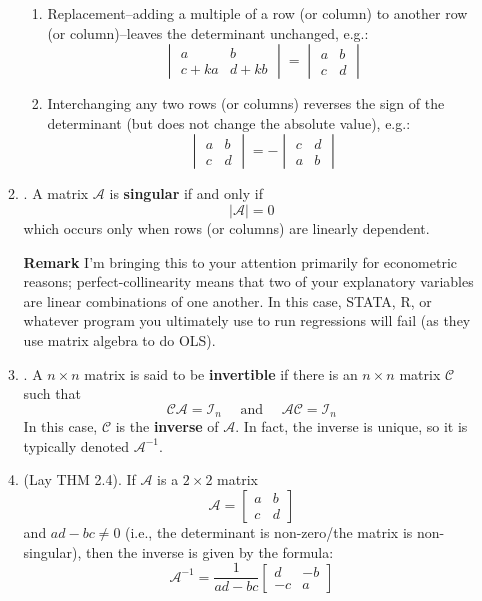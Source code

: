 \documentclass[12pt]{article}
\begin{document}
\begin{enumerate}
\begin{enumerate}
\begin{enumerate}
		\item Replacement--adding a multiple of a row (or column) to another row (or column)--leaves the determinant unchanged, e.g.:
			\[\begin{vmatrix}
				a	&b		\\
				c+ka	&d+kb	\end{vmatrix}
			=\begin{vmatrix}
				a	&b		\\
				c	&d		\end{vmatrix}\]

		\item Interchanging any two rows (or columns) reverses the sign of the determinant (but does not change the absolute value), e.g.:
			\[\begin{vmatrix}a & b \\ c & d \end{vmatrix} = - \begin{vmatrix} c & d \\ a & b\end{vmatrix}\]
		\end{enumerate}
			
	\item\underline{}.
		A matrix $\mathcal{A}$ is \textbf{singular} if and only if
					\[|\mathcal{A}|=0\]
		which occurs only when rows (or columns) are linearly dependent.
	
	\textbf{Remark}
		I'm bringing this to your attention primarily for econometric reasons; perfect-collinearity means that two of your
		explanatory variables are linear combinations of one another. In this case, STATA, R, or whatever program you
		ultimately use to run regressions will fail (as they use matrix algebra to do OLS).
	

	\item\underline{}.
		A $n\times n$ matrix is said to be \textbf{invertible} if there is an $n\times n$ matrix $\mathcal{C}$ such that
			\[\mathcal{CA} = \mathcal{I}_n \quad\text{ and }\quad \mathcal{AC} = \mathcal{I}_n\]
		In this case, $\mathcal{C}$ is the \textbf{inverse} of $\mathcal{A}$. In fact, the inverse is unique, so it is typically
		denoted $\mathcal{A}^{-1}$.

\newpage

	\item\underline{} (Lay THM 2.4).
		If $\mathcal{A}$ is a $2\times 2$ matrix
			\[\mathcal{A}=\begin{bmatrix}
				a & b \\ c & d
				\end{bmatrix}\]
		and $ad-bc\neq 0$ (i.e., the determinant is non-zero/the matrix is non-singular), then the inverse is
			given by the formula:
			\[\mathcal{A}^{-1}=\frac{1}{ad-bc}\begin{bmatrix}d & -b \\ -c & a\end{bmatrix}\]
		

\end{enumerate}
\end{enumerate}
\end{document}
